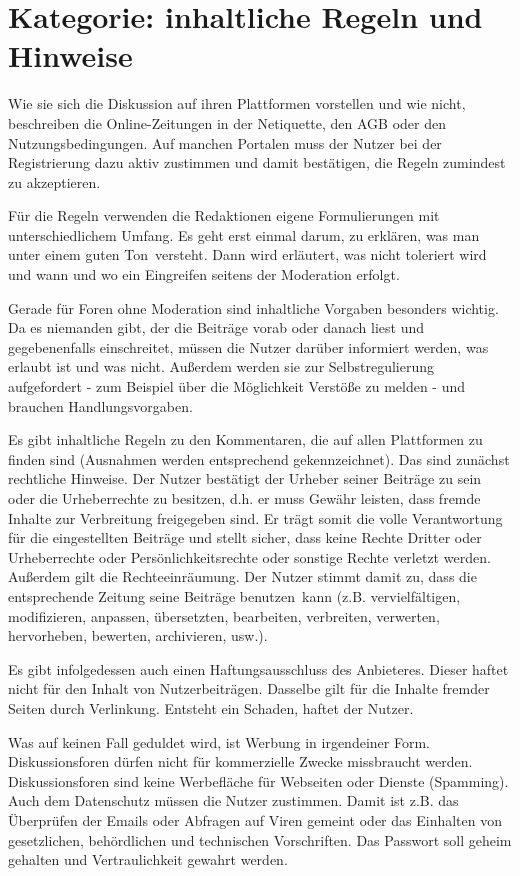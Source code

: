
\section{Kategorie: \glqq inhaltliche Regeln und Hinweise\grqq}

Wie sie sich die Diskussion auf ihren Plattformen vorstellen und wie nicht,
beschreiben die Online-Zeitungen in der Netiquette, den AGB oder den
Nutzungsbedingungen. Auf manchen Portalen muss der Nutzer bei der Registrierung
dazu aktiv zustimmen und damit bestätigen, die Regeln zumindest zu akzeptieren.

Für die Regeln verwenden die Redaktionen eigene Formulierungen mit
unterschiedlichem Umfang. Es geht erst einmal darum, zu erklären, was man unter
einem \glqq guten Ton\grqq\ versteht. Dann wird erläutert, was nicht toleriert
wird und wann und wo ein Eingreifen seitens der Moderation erfolgt.

Gerade für Foren ohne Moderation sind inhaltliche Vorgaben besonders wichtig. Da
es niemanden gibt, der die Beiträge vorab oder danach liest und gegebenenfalls
einschreitet, müssen die Nutzer darüber informiert werden, was erlaubt ist und
was nicht. Außerdem werden sie zur Selbstregulierung aufgefordert - zum Beispiel
über die Möglichkeit Verstöße zu melden - und brauchen Handlungsvorgaben.

Es gibt inhaltliche Regeln zu den Kommentaren, die auf allen Plattformen zu
finden sind (Ausnahmen werden entsprechend gekennzeichnet).  Das sind zunächst
rechtliche Hinweise. Der Nutzer bestätigt der Urheber seiner Beiträge zu sein
oder die Urheberrechte zu besitzen, d.h. er muss Gewähr leisten, dass fremde
Inhalte zur Verbreitung freigegeben sind. Er trägt somit die volle Verantwortung
für die eingestellten Beiträge und stellt sicher, dass keine Rechte Dritter oder
Urheberrechte oder Persönlichkeitsrechte oder sonstige Rechte verletzt werden.
Außerdem gilt die Rechteeinräumung. Der Nutzer stimmt damit zu, dass die
entsprechende Zeitung seine Beiträge \glqq benutzen\grqq\ kann (z.B. vervielfältigen,
modifizieren, anpassen, übersetzten, bearbeiten, verbreiten, verwerten,
hervorheben, bewerten, archivieren, usw.).

Es gibt infolgedessen auch einen Haftungsausschluss des Anbieteres. Dieser
haftet nicht für den Inhalt von Nutzerbeiträgen. Dasselbe gilt für die Inhalte
fremder Seiten durch Verlinkung. Entsteht ein Schaden, haftet der Nutzer.

Was auf keinen Fall geduldet wird, ist Werbung in irgendeiner Form.
Diskussionsforen dürfen nicht für kommerzielle Zwecke missbraucht werden.
Diskussionsforen sind keine Werbefläche für Webseiten oder Dienste (Spamming).
Auch dem Datenschutz müssen die Nutzer zustimmen. Damit ist z.B. das
Über\-prü\-fen der Emails oder Abfragen auf Viren gemeint oder das Einhalten von
gesetzlichen, behördlichen und technischen Vorschriften. Das Passwort soll
geheim gehalten und Vertraulichkeit gewahrt werden.

